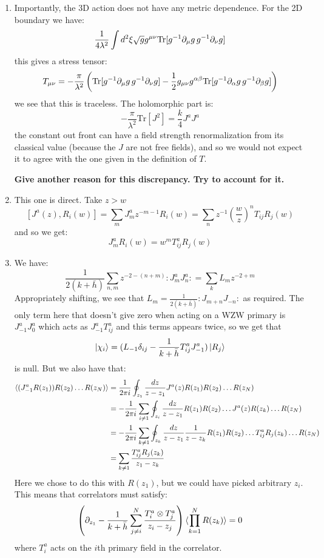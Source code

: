 \documentclass[11pt]{article}
\begin{document}
\begin{enumerate}
	\item Importantly, the 3D action does not have any metric dependence. For the 2D boundary we have:
	\[
		\frac{1}{4 \lambda^2} \int d^2 \xi \sqrt{g} g^{\mu \nu} \mathrm{Tr}[g^{-1}\partial_\mu g\, g^{-1} \partial_\nu g]
	\]
	this gives a stress tensor:
	\[
		T_{\mu \nu} = - \frac{\pi}{\lambda^2} \left(\mathrm{Tr}[g^{-1}\partial_\mu g\, g^{-1} \partial_\nu g] - \frac12 g_{\mu \nu} g^{\alpha \beta} \mathrm{Tr}[g^{-1}\partial_\alpha g\, g^{-1} \partial_\beta g] \right)
	\]
	we see that this is traceless. The holomorphic part is:
	\[
		- \frac{\pi}{\lambda^2} \mathrm{Tr}[J^2] = \frac{k}{4} J^a J^a
	\]
	the constant out front can have a field strength renormalization from its classical value (because the $J$ are not free fields), and so we would not expect it to agree with the one given in the definition of $T$.
	
	\textbf{Give another reason for this discrepancy. Try to account for it.}
	
	\item This one is direct. Take $z > w$
	\[
		[J^a(z), R_i(w)] = \sum_{m} J^a_m z^{-m-1} R_i (w) = \sum_{n} z^{-1} \left(\frac wz \right)^n T_{ij} R_j(w)
	\]
	and so we get:
	\[
		J^a_m R_i(w) = w^m T^a_{ij} R_j(w)
	\]
	
	\item We have:
	\[
		\frac{1}{2(k+\bar h)} \sum_{n,m} z^{-2-(n+m)} :J^a_m J^a_n: = \sum_{k} L_m z^{-2 + m}
	\]
	Appropriately shifting, we see that $L_m = \frac{1}{2(k+\bar h)} :J_{m+n} J_{-n}:$ as required. The only term here that doesn't give zero when acting on a WZW primary is $J_{-1}^a J_0^a$ which acts as $J_{-1}^a T_{ij}^a$ and this terms appears twice, so we get that
	\[
		\ket{\chi_i} = (L_{-1} \delta_{ij} - \frac{1}{k + \bar h} T^a_{ij} J^a_{-1} ) \ket{R_j}
	\]
	is null. But we also have that:
	\[
	\begin{aligned}
		\braket{(J_{-1}^a R(z_1)) R(z_2) \dots R(z_N)} &= \frac{1}{2\pi i} \oint_{z_1} \frac{dz}{z-z_1} J^a(z) R(z_1) R(z_2) \dots R(z_N)\\
		&=  - \frac{1}{2\pi i} \sum_{i \neq 1} \oint_{z_i} \frac{dz}{z-z_1} R(z_1) R(z_2)\dots J^a(z) R(z_k) \dots R(z_N)\\
		&= - \frac{1}{2\pi i} \sum_{k \neq 1} \oint_{z_k} \frac{dz}{z-z_1} \frac{1}{z-z_k} R(z_1) R(z_2)\dots T^a_{ij} R_{j}(z_k) \dots R(z_N)\\
		&= \sum_{k \neq 1} \frac{T^a_{ij} R_j(z_k)}{z_1 - z_k}
	\end{aligned}
	\]
	Here we chose to do this with $R(z_1)$, but we could have picked arbitrary $z_i$. This means that correlators must satisfy:
	\[
		\left(\partial_{z_1} -   \frac{1}{k + \bar h} \sum_{j \neq i}^N \frac{T^a_i \otimes T^a_j}{z_i - z_j} \right) \braket{\prod_{k=1}^N R(z_k)} = 0
	\]
	where $T^a_i$ acts on the $i$th primary field in the correlator. 
	

\end{enumerate}
\end{document}
